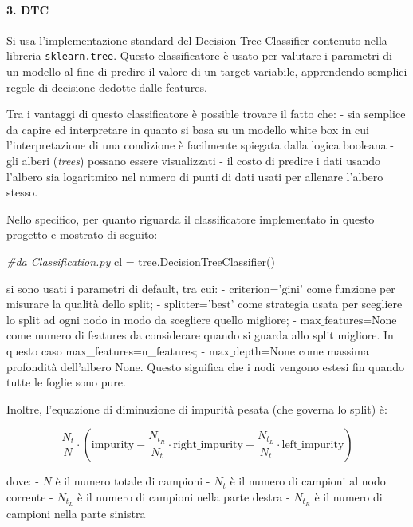 \documentclass[11pt]{article}
\newenvironment{Shaded}{}{}
\newcommand{\CommentTok}[1]{\textcolor[rgb]{0.38,0.63,0.69}{\textit{{#1}}}}
\newcommand{\NormalTok}[1]{{#1}}
\newcommand{\OperatorTok}[1]{\textcolor[rgb]{0.40,0.40,0.40}{{#1}}}
\begin{document}
    \paragraph{3. DTC}\label{dtc}

    Si usa l'implementazione standard del Decision Tree Classifier contenuto
nella libreria \texttt{sklearn.tree}. Questo classificatore è usato per
valutare i parametri di un modello al fine di predire il valore di un
target variabile, apprendendo semplici regole di decisione dedotte dalle
features.

Tra i vantaggi di questo classificatore è possible trovare il fatto che:
- sia semplice da capire ed interpretare in quanto si basa su un modello
white box in cui l'interpretazione di una condizione è facilmente
spiegata dalla logica booleana - gli alberi (\emph{trees}) possano
essere visualizzati - il costo di predire i dati usando l'albero sia
logaritmico nel numero di punti di dati usati per allenare l'albero
stesso.

Nello specifico, per quanto riguarda il classificatore implementato in
questo progetto e mostrato di seguito:

\begin{Shaded}
\begin{Highlighting}[]
\CommentTok{#da Classification.py}
\NormalTok{cl }\OperatorTok{=}\NormalTok{ tree.DecisionTreeClassifier()      }
\end{Highlighting}
\end{Shaded}

si sono usati i parametri di default, tra cui: -
\(\text{criterion='gini'}\) come funzione per misurare la qualità dello
split; - \(\text{splitter='best'}\) come strategia usata per scegliere
lo split ad ogni nodo in modo da scegliere quello migliore; -
\(\text{max_features=None}\) come numero di features da considerare
quando si guarda allo split migliore. In questo caso
max\_features=n\_features; - \(\text{max_depth=None}\) come massima
profondità dell'albero None. Questo significa che i nodi vengono estesi
fin quando tutte le foglie sono pure.

Inoltre, l'equazione di diminuzione di impurità pesata (che governa lo
split) è:

\begin{equation*}
\frac{N_t}{N} \cdot \left(\text{impurity} - \frac{N_{t_R}}{N_t} \cdot \text{right_impurity} - \frac{N_{t_L}}{N_t} \cdot \text{left_impurity} \right)
\end{equation*}

dove: - \(N\) è il numero totale di campioni - \(N_t\) è il numero di
campioni al nodo corrente - \(N_{t_L}\) è il numero di campioni nella
parte destra - \(N_{t_R}\) è il numero di campioni nella parte sinistra
\end{document}

